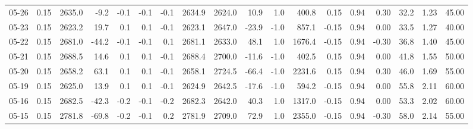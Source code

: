 \begin{threeparttable}
{\begin{tabular}{lrrrrrrrrrrrrrrrrr}
  05-26 &     0.15 & 2635.0 &              -9.2 &              -0.1 &               -0.1 &               -0.1 & 2634.9 & 2624.0 &       10.9 &                      1.0 &               400.8 &       0.15 &      0.94 &           0.30 &             32.2 &            1.23 &                  45.00 \\
  05-23 &     0.15 & 2623.2 &              19.7 &               0.1 &                0.1 &               -0.1 & 2623.1 & 2647.0 &      -23.9 &                     -1.0 &               857.1 &      -0.15 &      0.94 &           0.00 &             33.5 &            1.27 &                  40.00 \\
  05-22 &     0.15 & 2681.0 &             -44.2 &              -0.1 &               -0.1 &                0.1 & 2681.1 & 2633.0 &       48.1 &                      1.0 &              1676.4 &      -0.15 &      0.94 &          -0.30 &             36.8 &            1.40 &                  45.00 \\
  05-21 &     0.15 & 2688.5 &              14.6 &               0.1 &                0.1 &               -0.1 & 2688.4 & 2700.0 &      -11.6 &                     -1.0 &               402.5 &       0.15 &      0.94 &           0.00 &             41.8 &            1.55 &                  50.00 \\
  05-20 &     0.15 & 2658.2 &              63.1 &               0.1 &                0.1 &               -0.1 & 2658.1 & 2724.5 &      -66.4 &                     -1.0 &              2231.6 &       0.15 &      0.94 &           0.30 &             46.0 &            1.69 &                  55.00 \\
  05-19 &     0.15 & 2625.0 &              13.9 &               0.1 &                0.1 &               -0.1 & 2624.9 & 2642.5 &      -17.6 &                     -1.0 &               594.2 &      -0.15 &      0.94 &           0.00 &             55.8 &            2.11 &                  60.00 \\
  05-16 &     0.15 & 2682.5 &             -42.3 &              -0.2 &               -0.1 &               -0.2 & 2682.3 & 2642.0 &       40.3 &                      1.0 &              1317.0 &      -0.15 &      0.94 &           0.00 &             53.3 &            2.02 &                  60.00 \\
  05-15 &     0.15 & 2781.8 &             -69.8 &              -0.2 &               -0.1 &                0.2 & 2781.9 & 2709.0 &       72.9 &                      1.0 &              2355.0 &      -0.15 &      0.94 &          -0.30 &             58.0 &            2.14 &                  55.00 \\

\end{tabular}}
\end{threeparttable}
